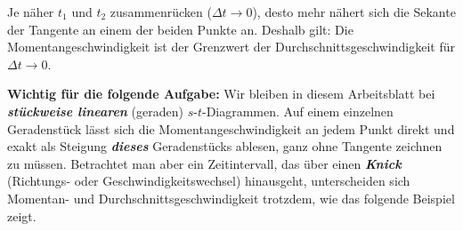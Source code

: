 \begin{theoriebox}
Je näher $t_1$ und $t_2$ zusammenrücken ($\Delta t \to 0$), desto mehr
nähert sich die Sekante der Tangente an einem der beiden Punkte an.
Deshalb gilt: Die Momentangeschwindigkeit ist der Grenzwert der
Durchschnittsgeschwindigkeit für $\Delta t \to 0$.

\textbf{Wichtig für die folgende Aufgabe:} Wir bleiben in diesem
Arbeitsblatt bei \textbf{\emph{stückweise linearen}} (geraden) $s$-$t$-Diagrammen.
Auf einem einzelnen Geradenstück lässt sich die Momentangeschwindigkeit an
jedem Punkt direkt und exakt als Steigung \textbf{\emph{dieses}} Geradenstücks
ablesen, ganz ohne Tangente zeichnen zu müssen. Betrachtet man aber ein
Zeitintervall, das über einen \textbf{\emph{Knick}} (Richtungs- oder
Geschwindigkeitswechsel) hinausgeht, unterscheiden sich Momentan- und
Durchschnittsgeschwindigkeit trotzdem, wie das folgende Beispiel zeigt.
\end{theoriebox}

